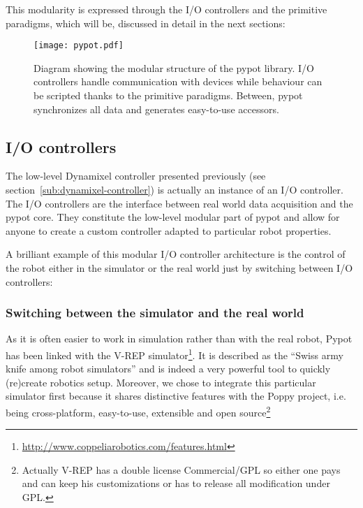 This modularity is expressed through the I/O controllers and the primitive paradigms, which will be, discussed in detail in the next sections:


\begin{figure}[p]
    \centering
        \texttt{[image: pypot.pdf]}

    \caption{Diagram showing the modular structure of the pypot library.  I/O controllers handle communication with devices while behaviour can be scripted thanks to the primitive paradigms. Between, pypot synchronizes all data and generates easy-to-use accessors.}
    \label{fig:pypot-modular-architecture}
\end{figure}


\subsection{I/O controllers} %
\label{sub:io-controllers}

The low-level Dynamixel controller presented previously (see section~\ref{sub:dynamixel-controller}) is actually an instance of an I/O controller. The I/O controllers are the interface between real world data acquisition and the pypot core. They constitute the low-level modular part of pypot and allow for anyone to create a custom controller adapted to particular robot properties.

A brilliant example of this modular I/O controller architecture is the control of the robot either in the simulator or the real world just by switching between I/O controllers:

\subsubsection{Switching between the simulator and the real world} %

As it is often easier to work in simulation rather than with the real robot, Pypot has been linked with the V-REP simulator\footnote{\url{http://www.coppeliarobotics.com/features.html}}. It is described as the “Swiss army knife among robot simulators” and is indeed a very powerful tool to quickly (re)create robotics setup. Moreover, we chose to integrate this particular simulator first because it shares distinctive features with the Poppy project, i.e. being cross-platform, easy-to-use, extensible and open source\footnote{Actually V-REP has a double license Commercial/GPL so either one pays and can keep his customizations or has to release all modification under GPL.}

